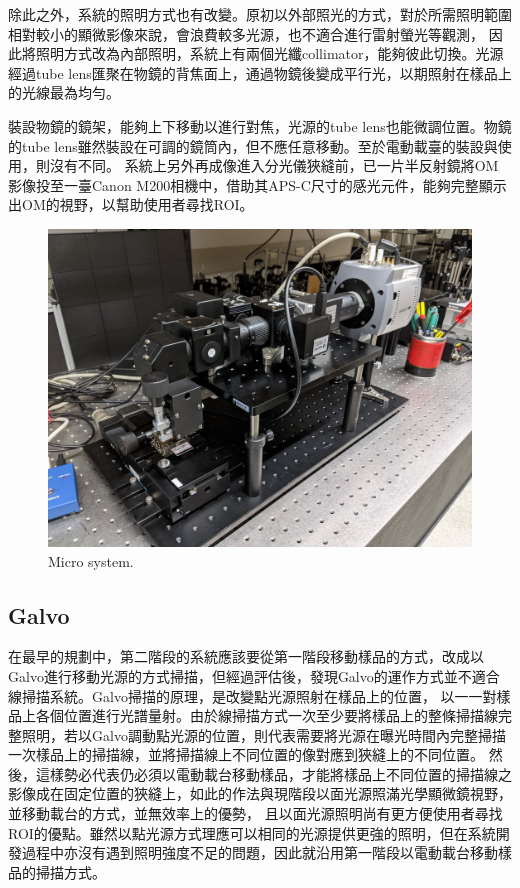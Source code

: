 \documentclass[12pt]{article}
\begin{document}
    除此之外，系統的照明方式也有改變。原初以外部照光的方式，對於所需照明範圍相對較小的顯微影像來說，會浪費較多光源，也不適合進行雷射螢光等觀測，
    因此將照明方式改為內部照明，系統上有兩個光纖collimator，能夠彼此切換。光源經過tube lens匯聚在物鏡的背焦面上，通過物鏡後變成平行光，以期照射在樣品上的光線最為均勻。

    裝設物鏡的鏡架，能夠上下移動以進行對焦，光源的tube lens也能微調位置。物鏡的tube lens雖然裝設在可調的鏡筒內，但不應任意移動。至於電動載臺的裝設與使用，則沒有不同。
    系統上另外再成像進入分光儀狹縫前，已一片半反射鏡將OM影像投至一臺Canon M200相機中，借助其APS-C尺寸的感光元件，能夠完整顯示出OM的視野，以幫助使用者尋找ROI。
    \begin{figure}
        \centering
        \includegraphics[width=\linewidth]{microSystemPixel3.jpg}
        \caption{Micro system.}
    \end{figure}

    \subsection{Galvo}
    在最早的規劃中，第二階段的系統應該要從第一階段移動樣品的方式，改成以Galvo進行移動光源的方式掃描，但經過評估後，發現Galvo的運作方式並不適合線掃描系統。Galvo掃描的原理，是改變點光源照射在樣品上的位置，
    以一一對樣品上各個位置進行光譜量射。由於線掃描方式一次至少要將樣品上的整條掃描線完整照明，若以Galvo調動點光源的位置，則代表需要將光源在曝光時間內完整掃描一次樣品上的掃描線，並將掃描線上不同位置的像對應到狹縫上的不同位置。
    然後，這樣勢必代表仍必須以電動載台移動樣品，才能將樣品上不同位置的掃描線之影像成在固定位置的狹縫上，如此的作法與現階段以面光源照滿光學顯微鏡視野，並移動載台的方式，並無效率上的優勢，
    且以面光源照明尚有更方便使用者尋找ROI的優點。雖然以點光源方式理應可以相同的光源提供更強的照明，但在系統開發過程中亦沒有遇到照明強度不足的問題，因此就沿用第一階段以電動載台移動樣品的掃描方式。
\end{document}
